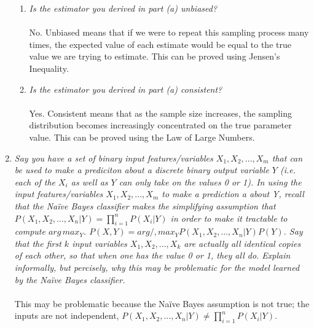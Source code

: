 \documentclass{article} %
\begin{document}
\begin{enumerate}
\begin{enumerate}
	\item \textit{Is the estimator you derived in part (a) unbiased?}\\
	\\	
	No. Unbiased means that if we were to repeat this sampling process many times, the expected value of each estimate would be equal to the true value we are trying to estimate. This can be proved using Jensen's Inequality.\\
	
	\item \textit{Is the estimator you derived in part (a) consistent?}\\
	\\
	Yes. Consistent means that as the sample size increases, the sampling distribution becomes increasingly concentrated on the true parameter value. This can be proved using the Law of Large Numbers.
	
	\end{enumerate}
	
	\item \textit{Say you have a set of binary input features/variables $X_1, X_2, ..., X_m$ that can be used to make a prediciton about a discrete binary output variable $Y$ (i.e. each of the $X_i$ as well as $Y$ can only take on the values 0 or 1). In using the input features/variables $X_1, X_2, ..., X_m$ to make a prediction a about Y, recall that the Na\"ive Bayes classifier makes the simplifying assumption that $P(X_1, X_2, ..., X_n | Y) = \prod_{i = 1}^{n} P(X_i | Y)$ in order to make it tractable to compute $arg\,max_{Y}$. $P(X,Y) = arg/,max_{Y} P(X_1, X_2, ..., X_n | Y) P(Y)$. Say that the first $k$ input variables $X_1, X_2, ..., X_k$ are actually all identical copies of each other, so that when one has the value 0 or 1, they all do. Explain informally, but percisely, why this may be problematic for the model learned by the Na\"ive Bayes classifier.}\\
	\\
	This may be problematic because the Na\"ive Bayes assumption is not true; the inputs are not independent, $P(X_1, X_2, ..., X_n | Y) \neq \prod_{i = 1}^{n} P(X_i | Y)$.
	

\end{enumerate}
\end{document}
